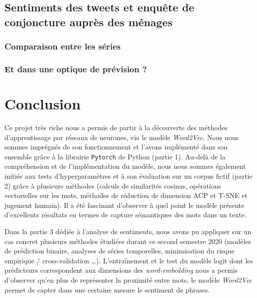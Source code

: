 \documentclass[11pt,french,french]{article}
\begin{document}
\hypertarget{sentiments-des-tweets-et-enquuxeate-de-conjoncture-aupruxe8s-des-muxe9nages}{%
\subsection{Sentiments des tweets et enquête de conjoncture auprès des ménages}\label{sentiments-des-tweets-et-enquuxeate-de-conjoncture-aupruxe8s-des-muxe9nages}}

\hypertarget{comparaison-entre-les-suxe9ries}{%
\subsubsection{Comparaison entre les séries}\label{comparaison-entre-les-suxe9ries}}

\hypertarget{et-dans-une-optique-de-pruxe9vision}{%
\subsubsection{Et dans une optique de prévision ?}\label{et-dans-une-optique-de-pruxe9vision}}

\hypertarget{conclusion}{%
\section*{Conclusion}\label{conclusion}}

Ce projet très riche nous a permis de partir à la découverte des méthodes d'apprentissage par réseaux de neurones, via le modèle \emph{Word2Vec}. Nous nous sommes imprégnés de son fonctionnement et l'avons implémenté dans son ensemble grâce à la librairie \texttt{Pytorch} de Python (partie 1). Au-delà de la compréhension et de l'implémentation du modèle, nous nous sommes également initiés aux tests d'hyperparamètres et à son évaluation sur un corpus fictif (partie 2) grâce à plusieurs méthodes (calculs de similarités cosinus, opérations vectorielles sur les mots, méthodes de réduction de dimension ACP et T-SNE et jugement humain). Il a été fascinant d'observer à quel point le modèle présente d'excellents résultats en termes de capture sémantiques des mots dans un texte.

Dans la partie 3 dédiée à l'analyse de sentiments, nous avons pu appliquer sur un cas concret plusieurs méthodes étudiées durant ce second semestre 2020 (modèles de prédiction binaire, analyses de séries temporelles, minimisation du risque empirique / cross-validation \ldots{}). L'entraînement et le test du modèle logit dont les prédicteurs correspondent aux dimensions des \emph{word-embedding} nous a permis d'observer qu'en plus de représenter la proximité entre mots, le modèle \emph{Word2Vec} permet de capter dans une certaine mesure le sentiment de phrases.
\end{document}
